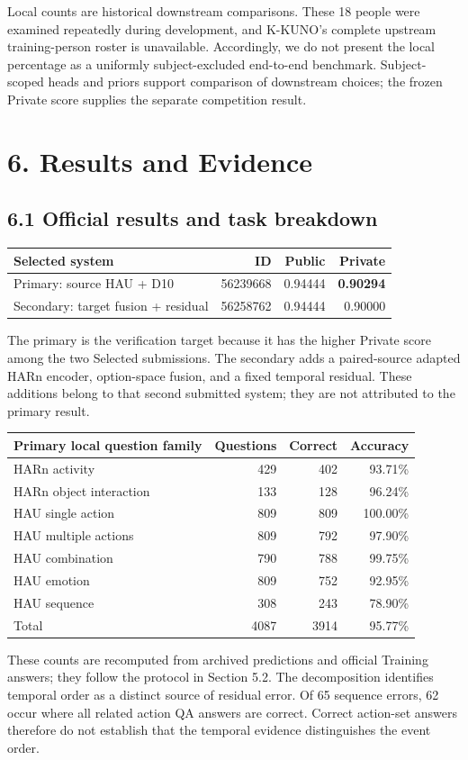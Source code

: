 \documentclass[12pt,a4paper]{article}
\newcommand{\pageheading}[1]{\vspace*{-5pt}\section*{#1}}
\begin{document}
Local counts are historical downstream comparisons. These 18 people were examined repeatedly during development, and K-KUNO's complete upstream training-person roster is unavailable. Accordingly, we do not present the local percentage as a uniformly subject-excluded end-to-end benchmark. Subject-scoped heads and priors support comparison of downstream choices; the frozen Private score supplies the separate competition result.

\pageheading{6. Results and Evidence}
\subsection*{6.1 Official results and task breakdown}
\begin{tabularx}{\linewidth}{@{}Yrrr@{}}
\toprule
Selected system & ID & Public & Private\\
\midrule
Primary: source HAU + D10 & 56239668 & 0.94444 & \textbf{0.90294}\\
Secondary: target fusion + residual & 56258762 & 0.94444 & 0.90000\\
\bottomrule
\end{tabularx}

The primary is the verification target because it has the higher Private score among the two Selected submissions. The secondary adds a paired-source adapted HARn encoder, option-space fusion, and a fixed temporal residual. These additions belong to that second submitted system; they are not attributed to the primary result.

\begin{tabularx}{\linewidth}{@{}Yrrr@{}}
\toprule
Primary local question family & Questions & Correct & Accuracy\\
\midrule
HARn activity & 429 & 402 & 93.71\%\\
HARn object interaction & 133 & 128 & 96.24\%\\
HAU single action & 809 & 809 & 100.00\%\\
HAU multiple actions & 809 & 792 & 97.90\%\\
HAU combination & 790 & 788 & 99.75\%\\
HAU emotion & 809 & 752 & 92.95\%\\
HAU sequence & 308 & 243 & 78.90\%\\
\midrule
Total & 4087 & 3914 & 95.77\%\\
\bottomrule
\end{tabularx}

These counts are recomputed from archived predictions and official Training answers; they follow the protocol in Section 5.2. The decomposition identifies temporal order as a distinct source of residual error. Of 65 sequence errors, 62 occur where all related action QA answers are correct. Correct action-set answers therefore do not establish that the temporal evidence distinguishes the event order.
\end{document}
